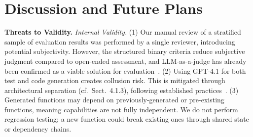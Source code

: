 \documentclass[sigconf,screen]{acmart}
\begin{document}
\section{Discussion and Future Plans}

\textbf{Threats to Validity.} \textit{Internal Validity.} (1) Our manual review of a stratified sample of evaluation results was performed by a single reviewer, introducing potential subjectivity. However, the structured binary criteria reduce subjective judgment compared to open-ended assessment, and LLM-as-a-judge has already been confirmed as a viable solution for evaluation~\cite{zheng2023judging}. (2) Using GPT-4.1 for both test and code generation creates collusion risk. This is mitigated through architectural separation (cf.\ Sect.~4.1.3), following established practices~\cite{huang2024agentcoder,dong2024selfcollaboration}. (3) Generated functions may depend on previously-generated or pre-existing   functions, meaning capabilities are not fully independent. We do not perform regression testing; a new function could break existing ones through shared state or dependency chains.
\end{document}
